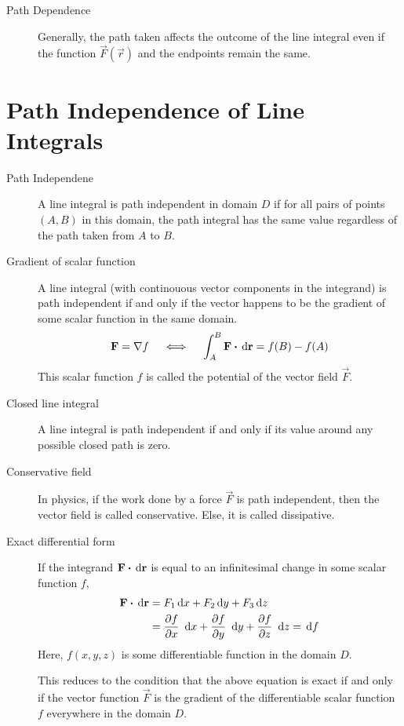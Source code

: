 \begin{description}
    \item[Path Dependence] Generally, the path taken affects the outcome of the line
        integral even if the function $ \vec{F}(\vec{r}) $ and the endpoints remain the
        same.
\end{description}

\section{Path Independence of Line Integrals}

\begin{description}
    \item[Path Independene] A line integral is path independent in domain $ D $ if for
        all pairs of points $ (A, B) $ in this domain, the path integral has the same
        value regardless of the path taken from $ A $ to $ B $.

    \item[Gradient of scalar function] A line integral (with continouous vector
        components in the integrand) is path independent if and only if the vector
        happens to
        be the gradient of some scalar function in the same domain.
        \begin{align}
            \vec{F} = \nabla f \quad \iff \quad
            \int_{A}^{B} \vec{F} \dotp \dl{\vec{r}} = f(B) - f(A)
        \end{align}
        This scalar function $ f $ is called the potential of the vector field
        $ \vec{F} $.

    \item[Closed line integral] A line integral is path independent if and only if
        its value around any possible closed path is zero.

    \item[Conservative field] In physics, if the work done by a force $ \vec{F} $ is
        path independent, then the vector field is called conservative. Else, it is called
        dissipative.

    \item[Exact differential form] If the integrand $ \vec{F} \dotp \dl{\vec{r}} $ is
        equal to an infinitesimal change in some scalar function $ f $,
        \begin{align}
            \vec{F} \dotp \dl{\vec{r}} & = F_1 \dl x + F_2 \dl y + F_3 \dl z    \\
                                       & =\diffp fx\ \dl x + \diffp fy\ \dl y +
            \diffp fz\ \dl z = \dl f
        \end{align}
        Here, $ f(x, y, z) $ is some differentiable function in the domain $ D $. \par
        This reduces to the condition that the above equation is exact if and only if
        the vector function $ \vec{F} $ is the gradient of the differentiable scalar
        function $ f $ everywhere in the domain $ D $.


\end{description}
